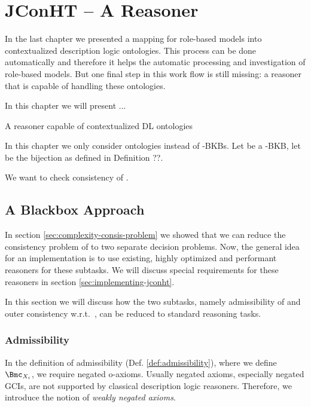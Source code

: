 
\chapter{JConHT -- A \texorpdfstring{\SHOIQSHOIQ}{SHOIQ[SHOIQ]} Reasoner}
\label{cha:jconht}

In the last chapter we presented a mapping for role-based models into contextualized description
logic ontologies. This process can be done automatically and therefore it helps the automatic
processing and investigation of role-based models. But one final step in this work flow is still
missing: a reasoner that is capable of handling these ontologies.

In this chapter we will present ...


A reasoner capable of contextualized DL ontologies


In this chapter we only consider \LMLO ontologies instead of \LMLO-BKBs. Let \Omc be a
\SHOIQSHOIQ-BKB, let \bsf be the bijection as defined in Definition ??.

We want to check consistency of \Omc. 

\section{A Blackbox Approach}
\label{sec:blackbox-approach}

In section \ref{sec:complexity-consis-problem} we showed that we can reduce the consistency problem
of \LMLO to two separate decision problems. Now, the general idea for an implementation is to use
existing, highly optimized and performant reasoners for these subtasks. We will discuss special
requirements for these reasoners in section \ref{sec:implementing-jconht}. 

In this section we will discuss how the two subtasks, namely admissibility of \Xmc and outer
consistency w.r.t.\ \Xmc, can be reduced to standard reasoning tasks.



\subsection{Admissibility}
\label{sec:admissibility}

In the definition of admissibility (Def. \ref{def:admissibility}), where we define $\Bmc_{X_{i}}$,
we require negated o-axioms. Usually negated axioms, especially negated GCIs, are not supported by
classical description logic reasoners. Therefore, we introduce the notion of \emph{weakly negated
  axioms}.

